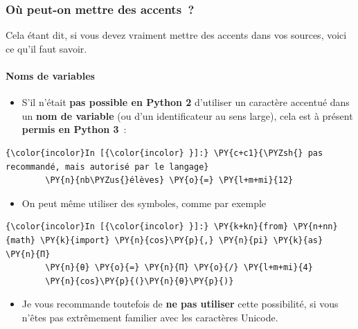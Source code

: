     \hypertarget{ouxf9-peut-on-mettre-des-accents}{%
\subsubsection{Où peut-on mettre des
accents~?}\label{ouxf9-peut-on-mettre-des-accents}}

    Cela étant dit, si vous devez vraiment mettre des accents dans vos
sources, voici ce qu'il faut savoir.

    \hypertarget{noms-de-variables}{%
\paragraph{Noms de variables}\label{noms-de-variables}}

    \begin{itemize}
\tightlist
\item
  S'il n'était \textbf{pas possible en Python 2} d'utiliser un caractère
  accentué dans un \textbf{nom de variable} (ou d'un identificateur au
  sens large), cela est à présent \textbf{permis en Python 3}~:
\end{itemize}

    \begin{Verbatim}[commandchars=\\\{\}]
{\color{incolor}In [{\color{incolor} }]:} \PY{c+c1}{\PYZsh{} pas recommandé, mais autorisé par le langage}
        \PY{n}{nb\PYZus{}élèves} \PY{o}{=} \PY{l+m+mi}{12}
\end{Verbatim}


    \begin{itemize}
\tightlist
\item
  On peut même utiliser des symboles, comme par exemple
\end{itemize}

    \begin{Verbatim}[commandchars=\\\{\}]
{\color{incolor}In [{\color{incolor} }]:} \PY{k+kn}{from} \PY{n+nn}{math} \PY{k}{import} \PY{n}{cos}\PY{p}{,} \PY{n}{pi} \PY{k}{as} \PY{n}{Π}
        \PY{n}{θ} \PY{o}{=} \PY{n}{Π} \PY{o}{/} \PY{l+m+mi}{4}
        \PY{n}{cos}\PY{p}{(}\PY{n}{θ}\PY{p}{)}
\end{Verbatim}


    \begin{itemize}
\tightlist
\item
  Je vous recommande toutefois de \textbf{ne pas utiliser} cette
  possibilité, si vous n'êtes pas extrêmement familier avec les
  caractères Unicode.
\end{itemize}

